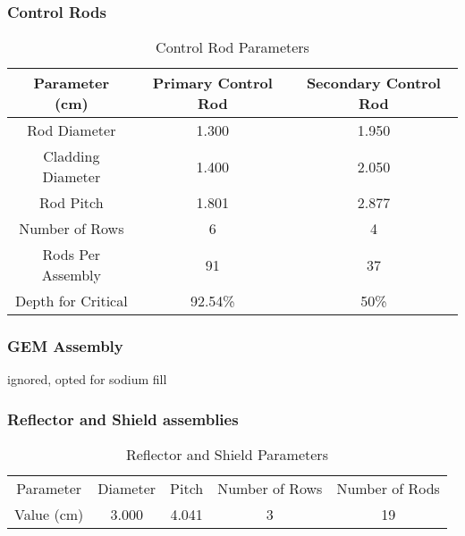 \documentclass[11pt]{article}
\begin{document}
\subsubsection{Control Rods}

\begin{table}
    \centering
    \caption{Control Rod Parameters}
    \begin{tabular}{ccc}
        \toprule
        \bottomrule
        Parameter (cm) & Primary Control Rod & Secondary Control Rod\\
        \toprule
        \bottomrule
        Rod Diameter & 1.300 & 1.950 \\
        Cladding Diameter & 1.400 & 2.050\\
        Rod Pitch & 1.801 & 2.877\\
        Number of Rows & 6 & 4 \\
        Rods Per Assembly & 91 & 37\\
        Depth for Critical & 92.54\% & 50\%\\
    \end{tabular}
\end{table}

\subsubsection{GEM Assembly}
ignored, opted for sodium fill

\subsubsection{Reflector and Shield assemblies}
\begin{table}
    \centering
    \caption{Reflector and Shield Parameters}
    \begin{tabular}{ccccc}
        Parameter & Diameter & Pitch & Number of Rows & Number of Rods\\
        Value (cm) & 3.000 & 4.041 & 3 & 19\\
    \end{tabular}
\end{table}
\end{document}
